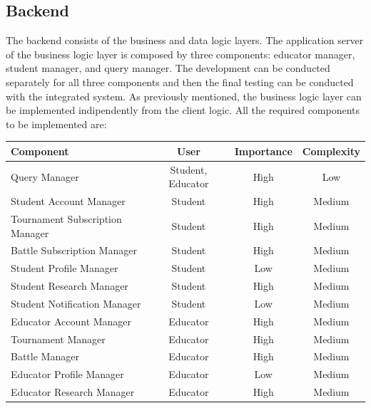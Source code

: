 \documentclass[12pt, a4paper]{report}
\begin{document}
    \subsection{Backend}
    The backend consists of the business and data logic layers. 
    The application server of the business logic layer is composed by three components: educator manager, student manager, and query manager. 
    The development can be conducted separately for all three components and then the final testing can be conducted with the integrated system. 
    As previously mentioned, the business logic layer can be implemented indipendently from the client logic. 
    All the required components to be implemented are: 
    \begin{table}[H]
        \begin{tabular}{lccc}
        \hline
        \textbf{Component}              & \textbf{User}     & \textbf{Importance} & \textbf{Complexity} \\ \hline
        Query Manager                   & Student, Educator & High                & Low                 \\
        Student Account Manager         & Student           & High                & Medium              \\
        Tournament Subscription Manager & Student           & High                & Medium              \\
        Battle Subscription Manager     & Student           & High                & Medium              \\
        Student Profile Manager         & Student           & Low                 & Medium              \\
        Student Research Manager        & Student           & High                & Medium              \\
        Student Notification Manager    & Student           & Low                 & Medium              \\
        Educator Account Manager        & Educator          & High                & Medium              \\
        Tournament Manager              & Educator          & High                & Medium              \\
        Battle Manager                  & Educator          & High                & Medium              \\
        Educator Profile Manager        & Educator          & Low                 & Medium              \\
        Educator Research Manager       & Educator          & High                & Medium              \\ \hline
        \end{tabular}
    \end{table}
\end{document}
